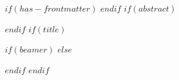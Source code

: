 $if(has-frontmatter)$
\frontmatter
$endif$
$if(abstract)$
\begin{abstract}
    $abstract$
\end{abstract}
$endif$
$if(title)$
\author{$for(authors)$$it.name.literal$$sep$$endfor$}
$if(beamer)$
\frame{\titlepage}
$else$
\maketitle
$endif$
$endif$
